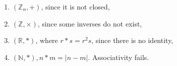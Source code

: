 \documentclass[10pt]{article}
\begin{document}
    \begin{example}
        \begin{enumerate}[(1)]
            \item $ (\mathbb{Z}_n, +) $, since it is not closed,
            \item $ (\mathbb{Z} , \times) $, since some inverses do not exist,
            \item $ (\mathbb{R} , *) $, where $ r*s = r^2 s $, since there is no identity,
            \item $ (\mathbb{N}, *), n*m = |n-m| $. Associativity fails.
        \end{enumerate}
    \end{example}
\end{document}
